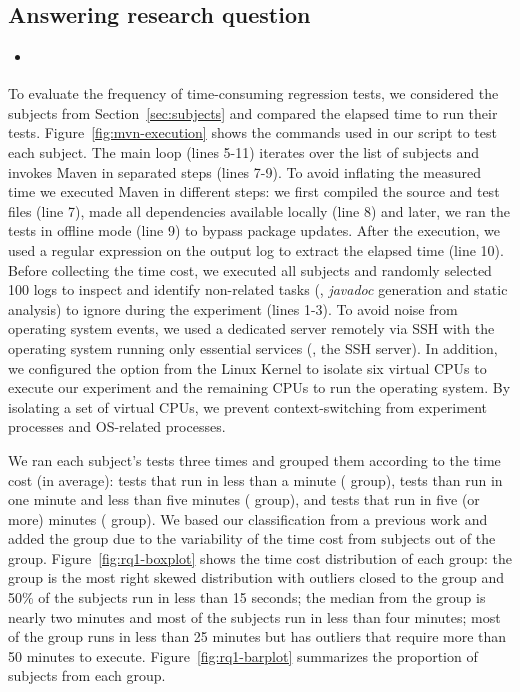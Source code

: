 \subsection{Answering research question \numRQA{}}
\label{sec:rqA}

\begin{itemize}
    \item \emph{\RQA}
\end{itemize}

To evaluate the frequency of time-consuming regression tests, we
considered the \numSubjs{} subjects from Section~\ref{sec:subjects}
and compared the elapsed time to run their tests. 
Figure~\ref{fig:mvn-execution} shows the commands used in our script
to test each subject. The main loop (lines 5-11) iterates over the
list of subjects and invokes Maven in separated steps (lines 7-9). To
avoid inflating the measured time we executed Maven in different
steps: we first compiled the source and test files (line 7), made all
dependencies available locally (line 8) and later, we ran the tests in
offline mode (line 9) to bypass package updates. After the execution,
we used a regular expression on the output log to extract the elapsed
time (line 10). Before collecting the time cost, we executed all
subjects and randomly selected 100 logs to inspect and identify
non-related tasks (\eg, \emph{javadoc} generation and static analysis)
to ignore during the experiment (lines 1-3).  To avoid noise from
operating system events, we used a dedicated server remotely via SSH
with the operating system running only essential services (\eg, the
SSH server). In addition, we configured the  option
from the Linux Kernel \cite{linux-kernel} to isolate six virtual CPUs
to execute our experiment and the remaining CPUs to run the operating
system. By isolating a set of virtual CPUs, we prevent
context-switching from experiment processes and OS-related processes.



We ran each subject's tests three times and grouped them according to
the time cost (in average): tests that run in less than a minute
(\shortg{} group), tests than run in one minute and less than five
minutes (\medg{} group), and tests that run in five (or more) minutes
(\longg{} group). We based our classification from a previous work
\cite{gligoric-etal-issta2015} and added the \medg{} group due to the
variability of the time cost from subjects out of the \shortg{} group.
Figure~\ref{fig:rq1-boxplot} shows the time cost distribution of each
group: the \shortg{} group is the most right skewed distribution with
outliers closed to the \medg{} group and 50\% of the subjects run in
less than 15 seconds; the median from the \medg{} group is nearly two
minutes and most of the subjects run in less than four minutes; most
of the \longg{} group runs in less than 25 minutes but has outliers
that require more than 50 minutes to execute.
Figure~\ref{fig:rq1-barplot} summarizes the proportion of subjects
from each group.

